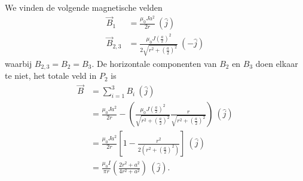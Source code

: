 \begin{description}[labelwidth=1.5cm, leftmargin=!]
\begin{enumerate}[$P_1$:]
\begin{description}[labelwidth=1.5cm, leftmargin=!]
                     We vinden de volgende magnetische velden
                    \begin{align*}
                        \vec{B}_1 
                            &= \frac{\mu_0Ja^2}{2r} \ (\hat{j}) \\
                        \vec{B}_{2,3} 
                            &=  \frac{\mu_0J(\frac{a}{2})^2}{2 \sqrt{r^2 + \left(\frac{a}{2}\right)^2}} \ (-\hat{j})
                    \end{align*}
                    waarbij $B_{2,3} = B_2 = B_3$. De horizontale componenten van $B_2$ en $B_3$ doen elkaar te niet, het totale veld in $P_2$ is
                    \begin{align*}
                        \vec{B} 
                            &= \sum_{i=1}^3 B_i \ (\hat{j}) \\
                            &= \frac{\mu_0Ja^2}{2r} - \left(\frac{\mu_0J(\frac{a}{2})^2}{\sqrt{r^2 + \left(\frac{a}{2}\right)^2}}\frac{r}{\sqrt{r^2 + \left(\frac{a}{2}\right)^2}}\right) \ (\hat{j}) \\
                            &= \frac{\mu_0Ja^2}{2r}\left[1 - \frac{r^2}{2\left(r^2 + \left(\frac{a}{2}\right)^2\right)}\right] \ (\hat{j}) \\
                            &=\frac{\mu_0I}{\pi r}\left(\frac{2r^2+a^2}{4r^2+a^2}\right) \ (\hat{j}).
                    \end{align*}
                \end{description}
        \end{enumerate}

\end{description}
\vspace{1cm}